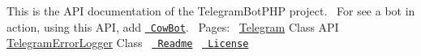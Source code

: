 This is the API documentation of the Telegram\+Bot\+PHP project.~\newline
 For see a bot in action, using this API, add \href{https://telegram.me/cowmooobot}{\texttt{ Cow\+Bot}}.~\newline
 Pages\+:~\newline
 \mbox{\hyperlink{class_telegram}{Telegram}} Class API ~\newline
 \mbox{\hyperlink{class_telegram_error_logger}{Telegram\+Error\+Logger}} Class~\newline
 \href{md__home_travis_build__eleirbag89__telegram_bot_p_h_p__r_e_a_d_m_e.html}{\texttt{ Readme}}~\newline
 \href{md__home_travis_build__eleirbag89__telegram_bot_p_h_p__l_i_c_e_n_s_e.html}{\texttt{ License}} 